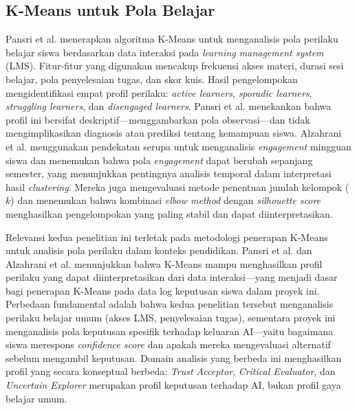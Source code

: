 \documentclass[12pt,a4paper,oneside,openany]{report}
\begin{document}
\subsection{K-Means untuk Pola Belajar}
\label{subsec:penelitian-kmeans}

Pansri et al. \cite{ref10} menerapkan algoritma K-Means untuk menganalisis pola perilaku belajar siswa berdasarkan data interaksi pada \textit{learning management system} (LMS). Fitur-fitur yang digunakan mencakup frekuensi akses materi, durasi sesi belajar, pola penyelesaian tugas, dan skor kuis. Hasil pengelompokan mengidentifikasi empat profil perilaku: \textit{active learners}, \textit{sporadic learners}, \textit{struggling learners}, dan \textit{disengaged learners}. Pansri et al. menekankan bahwa profil ini bersifat deskriptif---menggambarkan pola observasi---dan tidak mengimplikasikan diagnosis atau prediksi tentang kemampuan siswa. Alzahrani et al. \cite{ref11} menggunakan pendekatan serupa untuk menganalisis \textit{engagement} mingguan siswa dan menemukan bahwa pola \textit{engagement} dapat berubah sepanjang semester, yang menunjukkan pentingnya analisis temporal dalam interpretasi hasil \textit{clustering}. Mereka juga mengevaluasi metode penentuan jumlah kelompok ($k$) dan menemukan bahwa kombinasi \textit{elbow method} dengan \textit{silhouette score} menghasilkan pengelompokan yang paling stabil dan dapat diinterpretasikan.

Relevansi kedua penelitian ini terletak pada metodologi penerapan K-Means untuk analisis pola perilaku dalam konteks pendidikan. Pansri et al. dan Alzahrani et al. menunjukkan bahwa K-Means mampu menghasilkan profil perilaku yang dapat diinterpretasikan dari data interaksi---yang menjadi dasar bagi penerapan K-Means pada data log keputusan siswa dalam proyek ini. Perbedaan fundamental adalah bahwa kedua penelitian tersebut menganalisis perilaku belajar umum (akses LMS, penyelesaian tugas), sementara proyek ini menganalisis pola keputusan spesifik terhadap keluaran AI---yaitu bagaimana siswa merespons \textit{confidence score} dan apakah mereka mengevaluasi alternatif sebelum mengambil keputusan. Domain analisis yang berbeda ini menghasilkan profil yang secara konseptual berbeda: \textit{Trust Acceptor}, \textit{Critical Evaluator}, dan \textit{Uncertain Explorer} merupakan profil keputusan terhadap AI, bukan profil gaya belajar umum.

\end{document}
